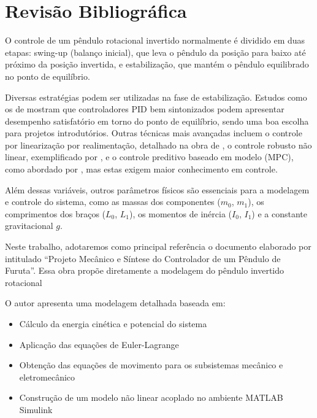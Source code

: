 \documentclass[9pt,a4paper,twocolumn,twoside]{tau-class/tau}
\begin{document}
\section{Revisão Bibliográfica}

   O controle de um pêndulo rotacional invertido normalmente é dividido em duas etapas: swing-up (balanço inicial), que leva o pêndulo da posição para baixo até próximo da posição invertida, e estabilização, que mantém o pêndulo equilibrado no ponto de equilíbrio.

    Diversas estratégias podem ser utilizadas na fase de estabilização. Estudos como os de \cite{mathew2013} mostram que controladores PID bem sintonizados podem apresentar desempenho satisfatório em torno do ponto de equilíbrio, sendo uma boa escolha para projetos introdutórios. Outras técnicas mais avançadas incluem o controle por linearização por realimentação, detalhado na obra de \cite{spong2008}, o controle robusto não linear, exemplificado por \cite{Furuta1992}, e o controle preditivo baseado em modelo (MPC), como abordado por \cite{deepak2019l}, mas estas exigem maior conhecimento em controle.

        Além dessas variáveis, outros parâmetros físicos são essenciais para a modelagem e controle do sistema, como as massas dos componentes ($m_0$, $m_1$), os comprimentos dos braços ($L_0$, $L_1$), os momentos de inércia ($I_0$, $I_1$) e a constante gravitacional $g$.

    Neste trabalho, adotaremos como principal referência o documento elaborado por \cite{yamane2021} intitulado “Projeto Mecânico e Síntese do Controlador de um Pêndulo de Furuta”. Essa obra propõe diretamente a modelagem do pêndulo invertido rotacional

    O autor apresenta uma modelagem detalhada baseada em:
    \begin{itemize}

    \item Cálculo da energia cinética e potencial do sistema
    
    \item Aplicação das equações de Euler-Lagrange  
    
    \item Obtenção das equações de movimento para os subsistemas mecânico e eletromecânico
    
    
    \item Construção de um modelo não linear acoplado no ambiente 
    MATLAB Simulink
    \end{itemize}
\end{document}
